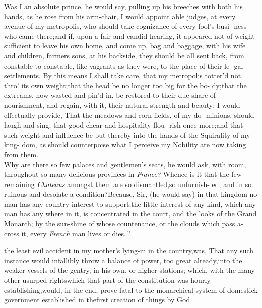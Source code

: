 \documentclass{article}
\begin{document}
\indent\lqq Was I an absolute prince, he would\break
say, pulling up his breeches with both\break
his hands, as he rose from his arm-chair,\break
\lqq I would appoint able judges, at every\break
\lqq avenue of my metropolis, who should\break
\lqq take cognizance of every fool’s busi-\break
\lqq ness who came there;\tsk and if, upon\break
\lqq a fair and candid hearing, it appeared\break
\lqq not of weight sufficient to leave his\break
\lqq own home, and come up, bag and\break
\lqq baggage, with his wife and children,\break
\lqq farmers sons, \etc \etc at his backside,\break
\lqq they should be all sent back, from\break
\lqq constable to constable, like vagrants 
\lqq as they were, to the place of their le-\break
\lqq gal settlements. By this means I shall\break
\lqq take care, that my metropolis totter’d\break
\lqq not thro’ its own weight;\tsk that the\break
\lqq head be no longer too big for the bo-\break
\lqq dy;\tsk that the extreams, now wasted\break
\lqq and pin’d in, be restored to their due\break
\lqq share of nourishment, and regain, with\break
\lqq it, their natural strength and beauty:\tsk\break
\lqq I would effectually provide, That the\break
\lqq meadows and corn-fields, of my do-\break
\lqq minions, should laugh and sing;\tsh\break
\lqq that good chear and hospitality flou-\break
\lqq rish once more;\tsk and that such weight\break
\lqq and influence be put thereby into the\break
\lqq hands of the Squirality of my king-\break
\lqq dom, as should counterpoise what I\break
\lqq perceive my Nobility are now taking\break
\lqq from them.\\
\newpage
\indent\lqq Why are there so few palaces and\break
\lqq gentlemen’s seats, he would ask, with\break
{}\break
room, \lqq throughout so many delicious\break
\lqq provinces in \textit{France?} Whence is it that\break
\lqq the few remaining \textit{Chateaus} amongst\break
\lqq them are so dismantled,\tsk so unfurnish-\break
\lqq ed, and in so ruinous and desolate a\break
\lqq condition?\tsh Because, Sir, (he would\break
say) \lqq in that kingdom no man has any\break
\lqq country-interest to support;\tsk the little\break
\lqq interest of any kind, which any man\break
\lqq has any where in it, is concentrated in\break
\lqq the court, and the looks of the Grand\break
\lqq Monarch; by the sun-shine of whose\break
\lqq countenance, or the clouds which pass\break
\lqq a-cross it, every \textit{French} man lives or\break
\lqq dies.\,”

\noindent
{}
the least evil accident in my mother’s lying-in in the
country,\tsh was, That any such instance would infallibly throw
a balance of power, too great already,\break into the weaker
vessels of the gentry, in his own, or higher stations;\tsh
which, with the many other usurped rights\break which that part
of the constitution was hourly establishing,\tsk would, in the
end, prove fatal to the monarchical system of domestick
government established in the\break first creation of things by
God.
\end{document}
